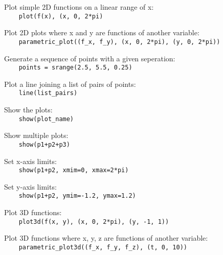 Plot simple 2D functions on a linear range of x:\\
{\ex \lstinline|    plot(f(x), (x, 0, 2*pi)|}

Plot 2D plots where x and y are functions of another variable:\\
{\ex \lstinline|    parametric_plot((f_x, f_y), (x, 0, 2*pi), (y, 0, 2*pi))|}

Generate a sequence of points with a given seperation:\\
{\ex \lstinline|    points = srange(2.5, 5.5, 0.25)|}

Plot a line joining a list of pairs of points:\\
{\ex \lstinline|    line(list_pairs)|}

Show the plots:\\
{\ex \lstinline|    show(plot_name)|}

Show multiple plots:\\
{\ex \lstinline|    show(p1+p2+p3)|}

Set x-axis limits:\\
{\ex \lstinline|    show(p1+p2, xmim=0, xmax=2*pi)|}

Set y-axis limits:\\
{\ex \lstinline|    show(p1+p2, ymim=-1.2, ymax=1.2)|}

Plot 3D functions:\\
{\ex \lstinline|    plot3d(f(x, y), (x, 0, 2*pi), (y, -1, 1))|}

Plot 3D functions where x, y, z are functions of another variable:\\
{\ex \lstinline|    parametric_plot3d((f_x, f_y, f_z), (t, 0, 10))|}

